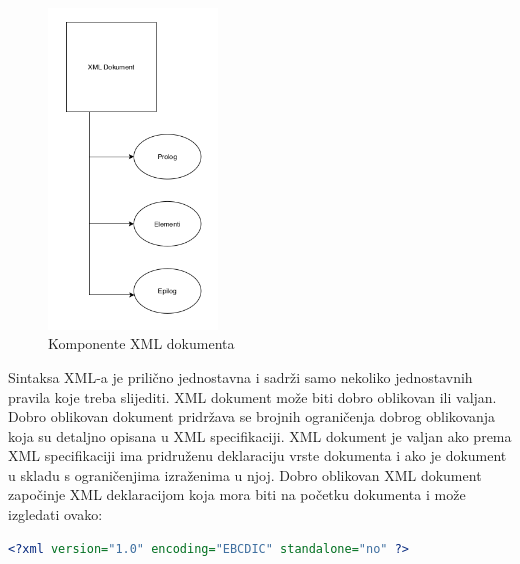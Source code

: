 \documentclass{foi}
\begin{document}
\begin{figure}[h!]
    \centering
    \includegraphics[width=0.4\textwidth]{slike/XMLkomponente.png}
    \caption{Komponente XML dokumenta}
\end{figure}

Sintaksa XML-a je prilično jednostavna i sadrži samo nekoliko jednostavnih pravila koje treba slijediti. XML dokument može biti dobro oblikovan ili valjan. Dobro oblikovan dokument pridržava se brojnih ograničenja dobrog oblikovanja koja su detaljno opisana u XML specifikaciji. XML dokument je valjan ako prema XML specifikaciji ima pridruženu deklaraciju vrste dokumenta i ako je dokument u skladu s ograničenjima izraženima u njoj. Dobro oblikovan XML dokument započinje XML deklaracijom koja mora biti na početku dokumenta i može izgledati ovako:

\begin{lstlisting}[language=XML]
<?xml version="1.0" encoding="EBCDIC" standalone="no" ?>
\end{lstlisting}
\end{document}
